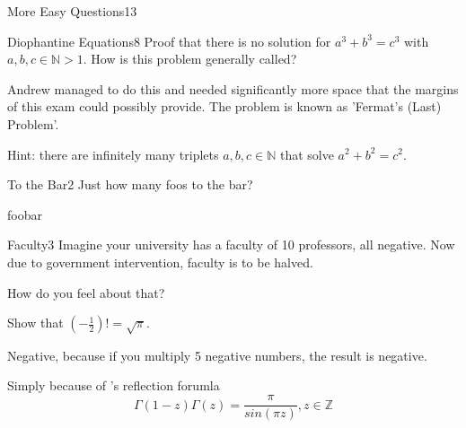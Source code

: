 
\begin{metaquestion}{More Easy Questions}{13}

\begin{subquestion}{Diophantine Equations}{8}
Proof that there is no solution for $a^3+b^3=c^3$ with $a,b,c \in \mathbb{N}>1$. How is this problem generally called?
\end{subquestion}

\begin{answer}
Andrew  managed to do this and needed significantly more space that the margins of this exam could possibly provide. The problem is known as 'Fermat's (Last) Problem'.
\end{answer}

\begin{hint}
Hint: there are infinitely many triplets $a,b,c \in \mathbb{N}$ that solve  $a^2+b^2=c^2$.  
\end{hint}

\begin{subquestion}{To the Bar}{2}
Just how many foos to the bar?
\end{subquestion}
\begin{answer}
foobar
\end{answer}

\begin{subquestion}{Faculty}{3}
Imagine your university has a faculty of 10 professors, all negative. Now due to government intervention, faculty is to be halved. 
\begin{compactenum}
\item How do you feel about that?
\item Show that 
$\left(-\frac{1}{2}\right)!=\sqrt{\pi}$.
\end{compactenum}
\begin{answer}
\begin{compactenum}
\item Negative, because if you multiply 5 negative numbers, the result is negative.
\item Simply because of 's reflection forumla $$ \Gamma (1-z)\Gamma(z)=\frac{\pi}{sin(\pi z)}, z \in \mathbb{Z} $$
\end{compactenum}
\end{answer}
\end{subquestion}


\end{metaquestion}   

 